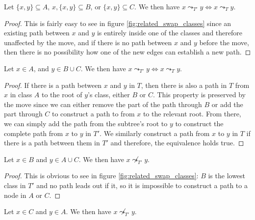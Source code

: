 \begin{lemma}
    \label{lem:related_swap_equal}
    Let $\{x, y\} \subseteq A$, $x, \{x, y\} \subseteq B$, or $\{x, y\} \subseteq C$. We then have $x \leadsto_{T'} y \Leftrightarrow x \leadsto_T y$.
\end{lemma}

\begin{proof}
    This is fairly easy to see in figure \ref{fig:related_swap_classes} since an existing path between $x$ and $y$ is entirely inside one of the classes and therefore unaffected by the move, and if there is no path between $x$ and $y$ before the move, then there is no possibility how one of the new edges can establish a new path.
\end{proof}

\begin{lemma}
    \label{lem:related_swap_abc}
    Let $x \in A$, and $y \in B \cup C$. We then have $x \leadsto_{T'} y \Leftrightarrow x \leadsto_T y$.
\end{lemma}

\begin{proof}
    If there is a path between $x$ and $y$ in $T$, then there is also a path in $T$ from $x$ in class $A$ to the root of $y$'s class, either $B$ or $C$. This property is preserved by the move since we can either remove the part of the path through $B$ or add the part through $C$ to construct a path to from $x$ to the relevant root. From there, we can simply add the path from the subtree's root to $y$ to construct the complete path from $x$ to $y$ in $T'$. We similarly construct a path from $x$ to $y$ in $T$ if there is a path between them in $T'$ and therefore, the equivalence holds true.
\end{proof}

\begin{lemma}
    \label{lem:related_swap_bac}
    Let $x \in B$ and $y \in A \cup C$. We then have $x \not\leadsto_{T'} y$.
\end{lemma}

\begin{proof}
    This is obvious to see in figure \ref{fig:related_swap_classes}: $B$ is the lowest class in $T'$ and no path leads out if it, so it is impossible to construct a path to a node in $A$ or $C$.
\end{proof}

\begin{lemma}
    \label{lem:related_swap_ca}
    Let $x \in C$ and $y \in A$. We then have $x \not\leadsto_{T'} y$.
\end{lemma}

